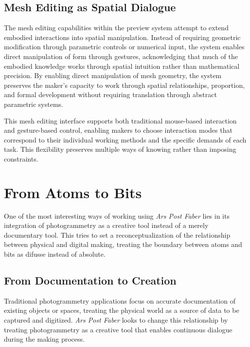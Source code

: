 \subsection{Mesh Editing as Spatial Dialogue}

The mesh editing capabilities within the preview system attempt to extend embodied interactions into spatial manipulation. Instead of requiring geometric modification through parametric controls or numerical input, the system enables direct manipulation of form through gestures, acknowledging that much of the embodied knowledge works through spatial intuition rather than mathematical precision. By enabling direct manipulation of mesh geometry, the system preserves the maker's capacity to work through spatial relationships, proportion, and formal development without requiring translation through abstract parametric systems.

\vspace{0.5cm}

This mesh editing interface supports both traditional mouse-based interaction and gesture-based control, enabling makers to choose interaction modes that correspond to their individual working methods and the specific demands of each task. This flexibility preserves multiple ways of knowing rather than imposing constraints.

\section{From Atoms to Bits}

One of the most interesting ways of working using \textit{Ars Post Faber} lies in its integration of photogrammetry as a creative tool instead of a merely documentary tool. This tries to set a reconceptualization of the relationship between physical and digital making, treating the boundary between atoms and bits as difusse instead of absolute.

\subsection{From Documentation to Creation}

Traditional photogrammetry applications focus on accurate documentation of existing objects or spaces, treating the physical world as a source of data to be captured and digitized. \textit{Ars Post Faber} looks to change this relationship by treating photogrammetry as a creative tool that enables continuous dialogue during the making process.

